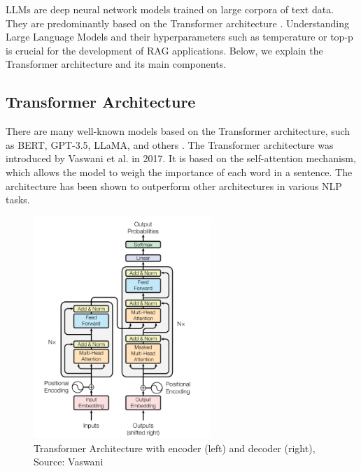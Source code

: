 LLMs are deep neural network models trained on large corpora of text data. They are predominantly based on the Transformer architecture \cite{Wolf.09.10.2019}. Understanding Large Language Models and their hyperparameters such as temperature or top-p is crucial for the development of RAG applications. Below, we explain the Transformer architecture and its main components.

\subsection{Transformer Architecture}
There are many well-known models based on the Transformer architecture, such as BERT, GPT-3.5, LLaMA, and others \cite{Yin.2024}. The Transformer architecture was introduced by Vaswani et al. in 2017. It is based on the self-attention mechanism, which allows the model to weigh the importance of each word in a sentence. The architecture has been shown to outperform other architectures in various NLP tasks.

\begin{figure}[!ht]
    \centering
    \includegraphics[width=0.6\textwidth]{images/transformers_architecture.png}
    \caption{Transformer Architecture with encoder (left) and decoder (right), Source: Vaswani \cite{vaswani2023attentionneed}}
    \label{fig:transformer_architecture}
\end{figure}


